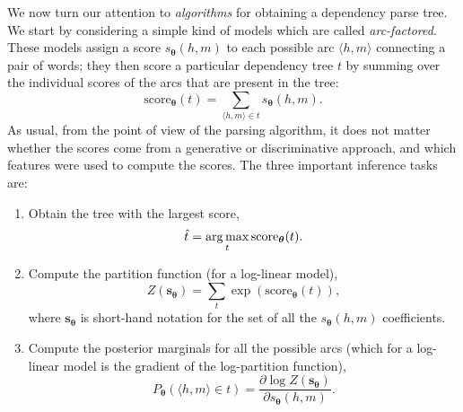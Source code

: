 We now turn our attention to \emph{algorithms} for obtaining a dependency parse tree. 
We start by considering a simple kind of models which are called \emph{arc-factored}.  
These models assign a score $s_{\boldsymbol{\theta}}(h,m)$ to each possible arc $\langle h,m \rangle$ connecting a pair of words; 
they then score a particular dependency tree $t$ by summing over the individual scores of the arcs that are present in the tree: 
$$\mathrm{score}_{\boldsymbol{\theta}}(t) = \sum_{\langle h,m \rangle \in t} s_{\boldsymbol{\theta}}(h,m).$$ 
As usual, from the point of view of the parsing algorithm, 
it does not matter whether the scores come from a generative or discriminative approach, and which features were used to compute the scores. 
The three important inference tasks are: 
\begin{enumerate}
\item Obtain the tree with the largest score, 
$${\hat t} = \operatorname*{arg\,max}_t \mathrm{score}_{\boldsymbol{\theta}}(t).$$
\item Compute the partition function (for a log-linear model),
$$Z(\mathbf{s_{\boldsymbol{\theta}}}) = \sum_t \exp(\mathrm{score}_{\boldsymbol{\theta}}(t)),$$
where $\mathbf{s_{\boldsymbol{\theta}}}$ is short-hand notation for the set of all the $s_{\boldsymbol{\theta}}( h,m )$ coefficients.
\item Compute the posterior marginals for all the possible arcs (which for a log-linear model is the gradient of the log-partition function), 
$$P_{\boldsymbol{\theta}}(\langle h,m \rangle \in t) = \frac{\partial \log Z(\mathbf{s_{\boldsymbol{\theta}}})}{\partial s_{\boldsymbol{\theta}}( h,m )}.$$
\end{enumerate}


